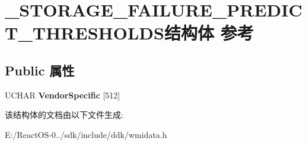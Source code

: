\hypertarget{struct___s_t_o_r_a_g_e___f_a_i_l_u_r_e___p_r_e_d_i_c_t___t_h_r_e_s_h_o_l_d_s}{}\section{\+\_\+\+S\+T\+O\+R\+A\+G\+E\+\_\+\+F\+A\+I\+L\+U\+R\+E\+\_\+\+P\+R\+E\+D\+I\+C\+T\+\_\+\+T\+H\+R\+E\+S\+H\+O\+L\+D\+S结构体 参考}
\label{struct___s_t_o_r_a_g_e___f_a_i_l_u_r_e___p_r_e_d_i_c_t___t_h_r_e_s_h_o_l_d_s}
\subsection*{Public 属性}
\begin{DoxyCompactItemize}
\item 
\mbox{\label{struct___s_t_o_r_a_g_e___f_a_i_l_u_r_e___p_r_e_d_i_c_t___t_h_r_e_s_h_o_l_d_s_a1ec18c3ef363acc731a930eda26c046e}} 
U\+C\+H\+AR {\bfseries Vendor\+Specific} \mbox{[}512\mbox{]}
\end{DoxyCompactItemize}


该结构体的文档由以下文件生成\+:\begin{DoxyCompactItemize}
\item 
E\+:/\+React\+O\+S-\/0../sdk/include/ddk/wmidata.\+h\end{DoxyCompactItemize}
